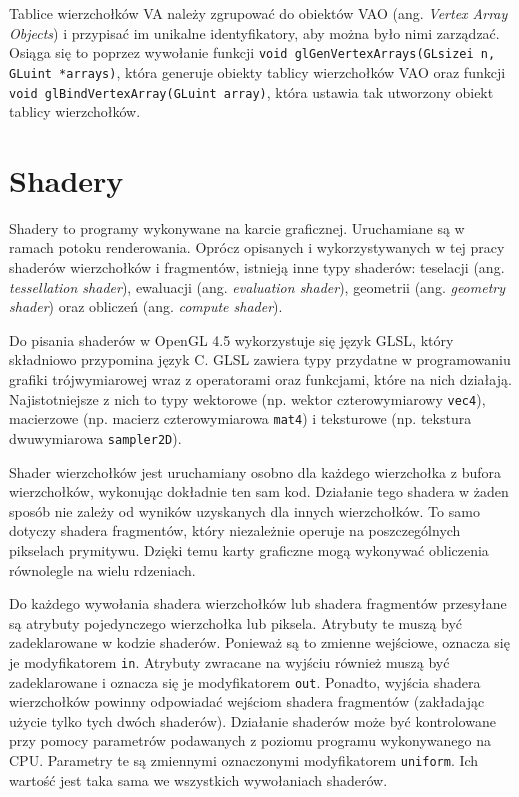 \documentclass[12pt, twoside, openany]{report}
\begin{document}
Tablice wierzchołków VA należy zgrupować do obiektów VAO (ang. \textit{Vertex Array Objects}) i przypisać im unikalne identyfikatory, aby można było nimi zarządzać. Osiąga się to poprzez wywołanie funkcji \texttt{void glGenVertexArrays(GLsizei n, GLuint *arrays)}, która generuje obiekty tablicy wierzchołków VAO oraz funkcji \texttt{void glBindVertexArray(GLuint array)}, która ustawia tak utworzony obiekt tablicy wierzchołków.

\section{Shadery}
\label{shadery}

Shadery to programy wykonywane na karcie graficznej. Uruchamiane są w ramach potoku renderowania. Oprócz opisanych i wykorzystywanych w tej pracy shaderów wierzchołków i fragmentów, istnieją inne typy shaderów: teselacji (ang. \textit{tessellation shader}), ewaluacji (ang. \textit{evaluation shader}), geometrii (ang. \textit{geometry shader}) oraz obliczeń (ang. \textit{compute shader}).

Do pisania shaderów w OpenGL 4.5 wykorzystuje się język GLSL, który składniowo przypomina język C. GLSL zawiera typy przydatne w programowaniu grafiki trójwymiarowej wraz z operatorami oraz funkcjami, które na nich działają. Najistotniejsze z nich to typy wektorowe (np. wektor czterowymiarowy \texttt{vec4}), macierzowe (np. macierz czterowymiarowa \texttt{mat4}) i teksturowe (np. tekstura dwuwymiarowa \texttt{sampler2D}).

Shader wierzchołków jest uruchamiany osobno dla każdego wierzchołka z bufora wierzchołków, wykonując dokładnie ten sam kod. Działanie tego shadera w żaden sposób nie zależy od wyników uzyskanych dla innych wierzchołków. To samo dotyczy shadera fragmentów, który niezależnie operuje na poszczególnych pikselach prymitywu. Dzięki temu karty graficzne mogą wykonywać obliczenia równolegle na wielu rdzeniach.

Do każdego wywołania shadera wierzchołków lub shadera fragmentów przesyłane są atrybuty pojedynczego wierzchołka lub piksela. Atrybuty te muszą być zadeklarowane w kodzie shaderów. Ponieważ są to zmienne wejściowe, oznacza się je modyfikatorem \texttt{in}.  Atrybuty zwracane na wyjściu również muszą być zadeklarowane i oznacza się je modyfikatorem \texttt{out}. Ponadto, wyjścia shadera wierzchołków powinny odpowiadać wejściom shadera fragmentów (zakładając użycie tylko tych dwóch shaderów). Działanie shaderów może być kontrolowane przy pomocy parametrów podawanych z poziomu programu wykonywanego na CPU. Parametry te są zmiennymi oznaczonymi modyfikatorem \texttt{uniform}. Ich wartość jest taka sama we wszystkich wywołaniach shaderów.
\end{document}
